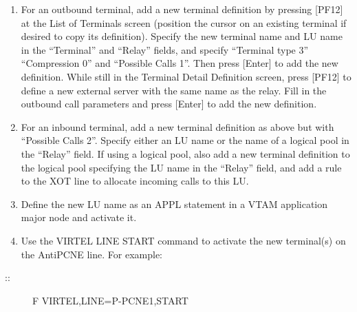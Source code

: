 \documentclass[letterpaper,10pt,english]{sphinxmanual}
\begin{document}
\begin{enumerate}
\item {} 
For an outbound terminal, add a new terminal definition by pressing {[}PF12{]} at the List of Terminals screen (position the cursor on an existing terminal if desired to copy its definition). Specify the new terminal name and LU name in the “Terminal” and “Relay” fields, and specify “Terminal type 3” “Compression 0” and “Possible Calls 1”. Then press {[}Enter{]} to add the new definition. While still in the Terminal Detail Definition screen, press {[}PF12{]} to define a new external server with the same name as the relay. Fill in the outbound   call parameters and press {[}Enter{]} to add the new definition.

\item {} 
For an inbound terminal, add a new terminal definition as above but with “Possible Calls 2”. Specify either an LU name or the name of a logical pool in the “Relay” field. If using a logical pool, also add a new terminal definition to the logical pool specifying the LU name in the “Relay” field, and add a rule to the XOT line to allocate incoming calls to this LU.

\item {} 
Define the new LU name as an APPL statement in a VTAM application major node and activate it.

\item {} 
Use the VIRTEL LINE START command to activate the new terminal(s) on the AntiPCNE line. For example:

\end{enumerate}
\begin{description}
\item[{::}] \leavevmode
F VIRTEL,LINE=P-PCNE1,START

\end{description}
\end{document}
